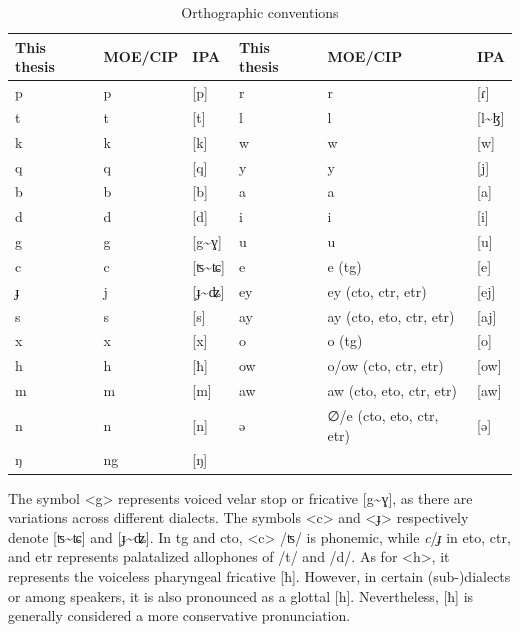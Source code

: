 \begin{table}[!htbp]
\centering
\caption{Orthographic conventions}
\label{tab:orth}
\begin{tabular}{lll|lll}
\hline
This thesis & MOE/CIP & IPA    & This thesis & MOE/CIP                   & IPA   \\ \hline
p          & p       & [p]    & r          & r                         & [ɾ]   \\
t          & t       & [t]    & l          & l                         & [l\~{ }ɮ] \\
k          & k       & [k]    & w          & w                         & [w]   \\
q          & q       & [q]    & y          & y                         & [j]   \\
b          & b       & [b]    & a          & a                         & [a]   \\
d          & d       & [d]    & i          & i                         & [i]   \\
g          & g       & [g\~{ }ɣ]  & u      & u                         & [u]   \\
c          & c       & [ʦ\~{ }ʨ]   & e     & e (\ac{tg})                  & [e]   \\
ɟ          & j       & [ɟ\~{ }ʥ] & ey      & ey (\ac{cto}, \ac{ctr}, \ac{etr})   & [ej]  \\
s          & s       & [s]    & ay         & ay (\ac{cto}, \ac{eto}, \ac{ctr}, \ac{etr})  & [aj]      \\
x          & x       & [x]    & o          & o (\ac{tg})                  & [o]   \\
h          & h       & [ħ]    & ow         & o/ow (\ac{cto}, \ac{ctr}, \ac{etr}) & [ow]  \\
m          & m       & [m]    & aw         & aw (\ac{cto}, \ac{eto}, \ac{ctr}, \ac{etr})                         & [aw]      \\
n          & n       & [n]    & ə          & ∅/e (\ac{cto}, \ac{eto}, \ac{ctr}, \ac{etr})    & [ə]   \\
ŋ          & ng      & [ŋ]    &            &                           &       \\ \hline
\end{tabular}
\end{table}

The symbol <g> represents voiced velar stop or fricative [g\~{ }ɣ], as there are variations across different dialects. The symbols <c> and <ɟ> respectively denote [ʦ\~{ }ʨ] and [ɟ\~{ }ʥ]. In \acl{tg} and \acl{cto}, <c> /ʦ/ is phonemic, while \textit{c}/\textit{ɟ} in \acl{eto}, \acl{ctr}, and \acl{etr} represents palatalized allophones of /t/ and /d/. As for <h>, it represents the voiceless pharyngeal fricative [ħ]. However, in certain (sub-)dialects or among speakers, it is also pronounced as a glottal [h]. Nevertheless, [ħ] is generally considered a more conservative pronunciation.

